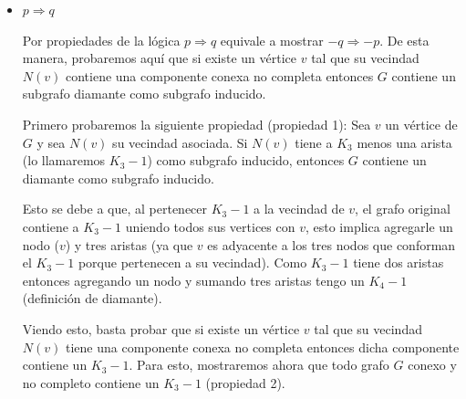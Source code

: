 \documentclass[a4paper,11pt] {article}
\begin{document}
\begin{itemize}
\item $p \Longrightarrow q$

Por propiedades de la l\'ogica $p \Longrightarrow q$ equivale a mostrar $-q \Longrightarrow -p$. De esta manera, probaremos aqu\'i que si existe un v\'ertice $v$ tal que su vecindad $N(v)$ contiene una componente conexa no completa entonces $G$ contiene un subgrafo diamante como subgrafo inducido.

Primero probaremos la siguiente propiedad (propiedad 1): Sea $v$ un v\'ertice de $G$ y sea $N(v)$ su vecindad asociada. Si $N(v)$ tiene a $K_{3}$ menos una arista (lo llamaremos $K_{3}-1$) como subgrafo inducido, entonces $G$ contiene un diamante como subgrafo inducido.

Esto se debe a que, al pertenecer $K_{3}-1$ a la vecindad de $v$, el grafo original contiene a $K_{3}-1$ uniendo todos sus vertices con $v$, esto implica agregarle un nodo ($v$) y tres aristas (ya que $v$ es adyacente a los tres nodos que conforman el $K_{3}-1$ porque pertenecen a su vecindad). Como $K_{3}-1$ tiene dos aristas entonces agregando un nodo y sumando tres aristas tengo un $K_{4}-1$ (definici\'on de diamante).

Viendo esto, basta probar que si existe un v\'ertice $v$ tal que su vecindad $N(v)$ tiene una componente conexa no completa entonces dicha componente contiene un $K_{3}-1$. Para esto, mostraremos ahora que todo grafo $G$ conexo y no completo contiene un $K_{3}-1$ (propiedad 2).


\end{itemize}
\end{document}
